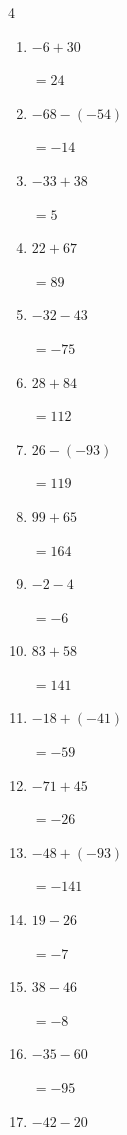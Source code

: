 \begin{multicols}{4}
\begin{enumerate}
        $=126$

\columnbreak %

  \item $-6+30$

        $=24$

  \item $-68-(-54)$

        $=-14$

  \item $-33+38$

        $=5$

  \item $22+67$

        $=89$

  \item $-32-43$

        $=-75$

  \item $28+84$

        $=112$

  \item $26-(-93)$

        $=119$

  \item $99+65$

        $=164$

  \item $-2-4$

        $=-6$

  \item $83+58$

        $=141$

  \item $-18+(-41)$

        $=-59$

  \item $-71+45$

        $=-26$

  \item $-48+(-93)$

        $=-141$

  \item $19-26$

        $=-7$

  \item $38-46$

        $=-8$

  \item $-35-60$

        $=-95$

  \item $-42-20$


\end{enumerate}
\end{multicols}
